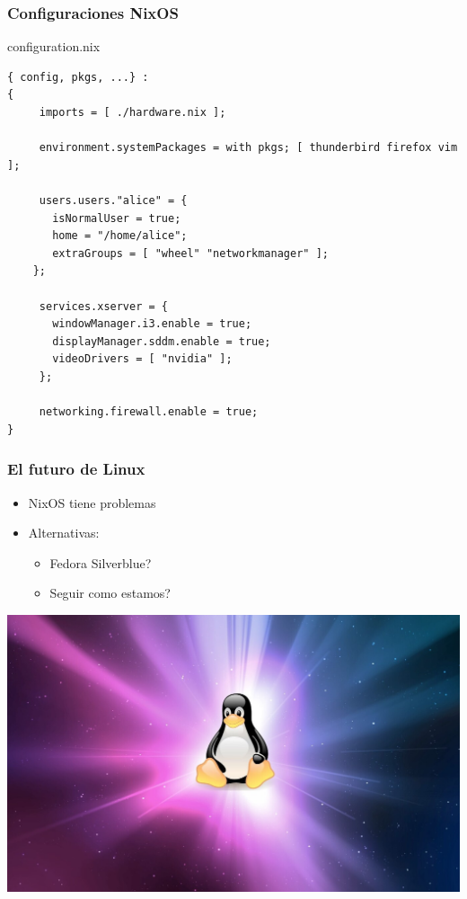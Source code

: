 \documentclass[aspectratio=43]{beamer}
\begin{document}
\begin{frame}[fragile]
\frametitle{Configuraciones NixOS}
\begin{block}{configuration.nix}
\fontsize{9}{11}\begin{verbatim}
{ config, pkgs, ...} :
{
     imports = [ ./hardware.nix ];

     environment.systemPackages = with pkgs; [ thunderbird firefox vim ];
     
     users.users."alice" = {
       isNormalUser = true;
       home = "/home/alice";
       extraGroups = [ "wheel" "networkmanager" ];
    };

     services.xserver = {
       windowManager.i3.enable = true;
       displayManager.sddm.enable = true;
       videoDrivers = [ "nvidia" ];
     };

     networking.firewall.enable = true;
}
\end{verbatim}
\end{block}
\end{frame}

\begin{frame}
    \frametitle{El futuro de Linux}
    \begin{itemize}
        \item NixOS tiene problemas
        \item Alternativas: 
        \begin{itemize}
        \item Fedora Silverblue?
        \item Seguir como estamos?
        \end{itemize}
    \end{itemize}
    \begin{center}
            \includegraphics[scale=0.34]{img/1366_2000.jpg}
    \end{center}
\end{frame}
\end{document}
